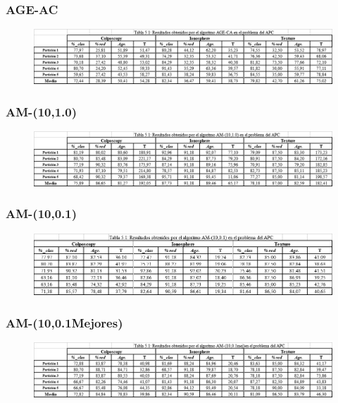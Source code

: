 \documentclass[12pt,a4paper]{article}
\begin{document}
\subsubsection{AGE-AC}
\begin{figure}[H]
	\centering
	\includegraphics[width=0.7\linewidth]{images/poblacion6}
	\caption{}
	\label{fig:poblacion6}
\end{figure}
\subsubsection{AM-(10,1.0)}
\begin{figure}[H]
	\centering
	\includegraphics[width=0.7\linewidth]{images/poblacion8}
	\caption{}
	\label{fig:poblacion8}
\end{figure}

\subsubsection{AM-(10,0.1)}
\begin{figure}[H]
	\centering
	\includegraphics[width=0.7\linewidth]{images/poblacion9}
	\caption{}
	\label{fig:poblacion9}
\end{figure}

\subsubsection{AM-(10,0.1Mejores)}
\begin{figure}[H]
	\centering
	\includegraphics[width=0.7\linewidth]{images/poblacion10}
	\caption{}
	\label{fig:poblacion10}
\end{figure}
\end{document}
